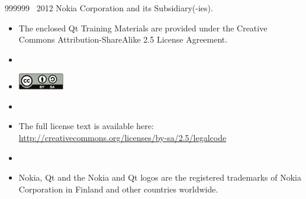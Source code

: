   \begin{slide}{999999}
    \vspace{5em}
    \textcopyright~2012 Nokia Corporation and its Subsidiary(-ies).    
    \vspace{2em}                                                     
    \begin{itemize}
      \item[] \footnotesize{The enclosed Qt Training Materials are provided under the
        Creative Commons Attribution-ShareAlike 2.5 License Agreement.}
      \item[]
      \item[] \mbox{\includegraphics[width=20mm]{images/cc-by-sa}}
      \item[]
      \item[] \footnotesize{The full license text is available here:  
      \url{http://creativecommons.org/licenses/by-sa/2.5/legalcode}}
      \item[]    
      \item[] \footnotesize{Nokia, Qt and the Nokia and Qt logos are the registered trademarks 
      of Nokia Corporation in Finland and other countries worldwide.}
    \end{itemize}
    
  \end{slide}
